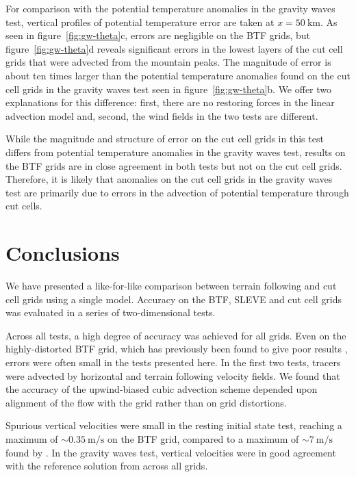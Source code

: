 \documentclass{ametsoc}
\begin{document}
For comparison with the potential temperature anomalies in the gravity waves test, vertical profiles of potential temperature error are taken at $x = \SI{50}{\kilo\meter}$.  As seen in figure~\ref{fig:gw-theta}c, errors are negligible on the BTF grids, but figure~\ref{fig:gw-theta}d reveals significant errors in the lowest layers of the cut cell grids that were advected from the mountain peaks.  The magnitude of error is about ten times larger than the potential temperature anomalies found on the cut cell grids in the gravity waves test seen in figure~\ref{fig:gw-theta}b.  We offer two explanations for this difference: first, there are no restoring forces in the linear advection model and, second, the wind fields in the two tests are different.

While the magnitude and structure of error on the cut cell grids in this test differs from potential temperature anomalies in the gravity waves test, results on the BTF grids are in close agreement in both tests but not on the cut cell grids.  Therefore, it is likely that anomalies on the cut cell grids in the gravity waves test are primarily due to errors in the advection of potential temperature through cut cells.

\section{Conclusions}
We have presented a like-for-like comparison between terrain following and cut cell grids using a single model.  Accuracy on the BTF, SLEVE and cut cell grids was evaluated in a series of two-dimensional tests.

Across all tests, a high degree of accuracy was achieved for all grids.  Even on the highly-distorted BTF grid, which has previously been found to give poor results \citep{schaer2002,klemp2011,good2014}, errors were often small in the tests presented here.  In the first two tests, tracers were advected by horizontal and terrain following velocity fields.  We found that the accuracy of the upwind-biased cubic advection scheme depended upon alignment of the flow with the grid rather than on grid distortions.

Spurious vertical velocities were small in the resting initial state test, reaching a maximum of $\sim \SI{0.35}{\meter\per\second}$ on the BTF grid, compared to a maximum of $\sim \SI{7}{\meter\per\second}$ found by \citet{klemp2011}.  In the gravity waves test, vertical velocities were in good agreement with the reference solution from \citet{melvin2010} across all grids.
\end{document}
